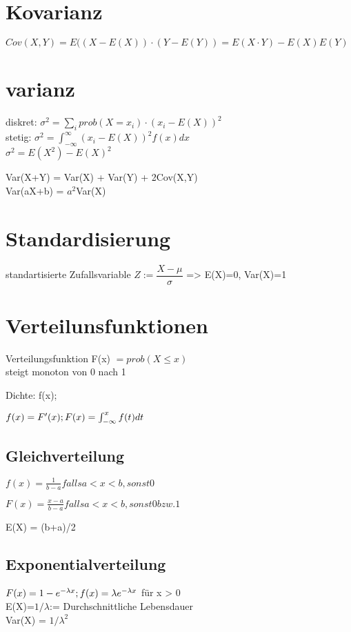\section*{Kovarianz}
$Cov(X,Y) = E((X-E(X))\cdot(Y-E(Y)) = E(X \cdot Y) -E(X)E(Y)$

\section*{varianz}
diskret: $ \sigma^2 = \sum_i prob(X=x_i)\cdot (x_i -E(X))^2$\\
stetig: $ \sigma^2 = \int_{-\infty}^{\infty} (x_i -E(X))^2 f(x) dx$ \\
$\sigma^2 = E(X^2) - E(X)^2$

Var(X+Y) = Var(X) + Var(Y) + 2Cov(X,Y)\\
Var(aX+b) = $a^2$Var(X)


\section*{Standardisierung}
standartisierte Zufallsvariable $Z:=\dfrac{X-\mu}{\sigma}$ => E(X)=0, Var(X)=1


\section*{Verteilunsfunktionen}
Verteilungsfunktion F(x) $= prob(X \leq x)$\\
steigt monoton von 0 nach 1

Dichte: f(x);

$f(x) = F'(x); \\
 F(x) = \int_{-\infty}^xf(t)dt$

\subsection*{Gleichverteilung}
$f(x) = \frac{1}{b-a} falls a < x < b, sonst 0$

$F(x)  = \frac{x-a}{b-a} falls a < x < b, sonst 0 bzw. 1$

E(X) = (b+a)/2

\subsection*{Exponentialverteilung}
$F(x) = 1 - e^{-\lambda x};  \\ f(x) = \lambda e^{-\lambda x}$ für x > 0 \\
E(X)=$1/\lambda$:= Durchschnittliche Lebensdauer\\
Var(X) = $1/\lambda^2$
